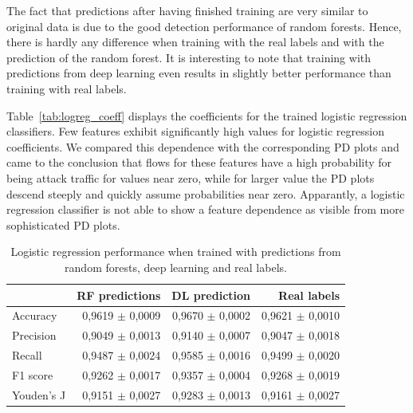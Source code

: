\documentclass[10pt,sigconf,letterpaper]{acmart}
\begin{document}
The fact that predictions after having finished training are very similar to original data is due to the good detection performance of random forests. Hence, there is hardly any difference when training with the real labels and with the prediction of the random forest. It is interesting to note that training with predictions from deep learning even results in slightly better performance than training with real labels.

 Table~\ref{tab:logreg_coeff} displays the coefficients for the trained logistic regression classifiers.
Few features exhibit significantly high values for logistic regression coefficients. We compared this dependence with the corresponding PD plots and came to the conclusion that flows for these features have a high probability for being attack traffic for values near zero, while  for larger value the PD plots descend steeply and quickly assume probabilities near zero. Apparantly, a logistic regression classifier is not able to show a feature dependence as visible from more sophisticated PD plots.
 
 \begin{table}
 \caption{Logistic regression performance when trained with predictions from random forests, deep learning and real labels.}
 \label{tab:logreg_results}
 \begin{tabular}{l r r r} \toprule
 & RF predictions & DL prediction & Real labels \\ \midrule
 Accuracy	&	0,9619 $\pm$ 0,0009	&	0,9670 $\pm$ 0,0002	&	0,9621 $\pm$ 0,0010	\\
Precision	&	0,9049 $\pm$ 0,0013	&	0,9140 $\pm$ 0,0007	&	0,9047 $\pm$ 0,0018	\\
Recall	&	0,9487 $\pm$ 0,0024	&	0,9585 $\pm$ 0,0016	&	0,9499 $\pm$ 0,0020	\\
F1 score	&	0,9262 $\pm$ 0,0017	&	0,9357 $\pm$ 0,0004	&	0,9268 $\pm$ 0,0019	\\
Youden's J	&	0,9151 $\pm$ 0,0027	&	0,9283 $\pm$ 0,0013	&	0,9161 $\pm$ 0,0027	\\
\bottomrule
\end{tabular}
\end{table}
\end{document}
